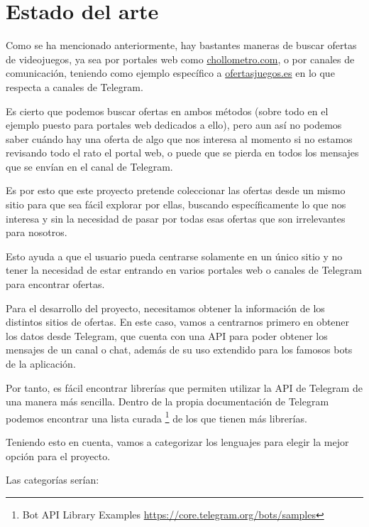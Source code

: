 \chapter{Estado del arte}

Como se ha mencionado anteriormente, hay bastantes maneras de buscar ofertas de 
videojuegos, ya sea por portales web como \url{chollometro.com}, o por canales de 
comunicación, teniendo como ejemplo específico a \url{ofertasjuegos.es} en lo que 
respecta a canales de Telegram.

Es cierto que podemos buscar ofertas en ambos métodos (sobre todo en el ejemplo 
puesto para portales web dedicados a ello), pero aun así no podemos saber cuándo 
hay una oferta de algo que nos interesa al momento si no estamos revisando todo el 
rato el portal web, o puede que se pierda en todos los mensajes que se envían en el 
canal de Telegram.

Es por esto que este proyecto pretende coleccionar las ofertas desde un mismo sitio 
para que sea fácil explorar por ellas, buscando específicamente lo que nos interesa 
y sin la necesidad de pasar por todas esas ofertas que son irrelevantes para 
nosotros.

Esto ayuda a que el usuario pueda centrarse solamente en un único sitio y no tener 
la necesidad de estar entrando en varios portales web o canales de Telegram para 
encontrar ofertas.

Para el desarrollo del proyecto, necesitamos obtener la información de los 
distintos sitios de ofertas. En este caso, vamos a centrarnos primero en obtener 
los datos desde Telegram, que cuenta con una API para poder obtener los mensajes de 
un canal o chat, además de su uso extendido para los famosos bots de la aplicación.

Por tanto, es fácil encontrar librerías que permiten utilizar la API de Telegram de  
una manera más sencilla. Dentro de la propia documentación de Telegram 
podemos encontrar una lista curada 
\footnote{Bot API Library Examples \url{https://core.telegram.org/bots/samples}} de 
los que tienen más librerías.

Teniendo esto en cuenta, vamos a categorizar los lenguajes para elegir la mejor 
opción para el proyecto.

Las categorías serían:

